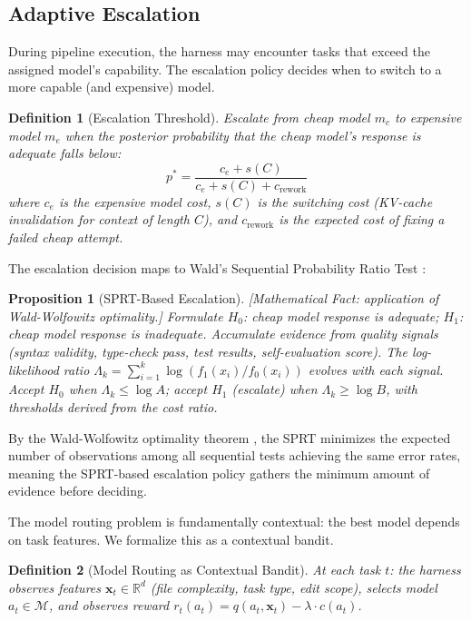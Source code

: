\documentclass[11pt, a4paper]{googledeepmind}
\newtheorem{definition}{Definition}[section]
\newtheorem{proposition}{Proposition}[section]
\begin{document}
\subsection{Adaptive Escalation}

During pipeline execution, the harness may encounter tasks that exceed the assigned model's capability. The escalation policy decides when to switch to a more capable (and expensive) model.

\begin{definition}[Escalation Threshold]
\label{def:routing-escalation}
Escalate from cheap model $m_c$ to expensive model $m_e$ when the posterior probability that the cheap model's response is adequate falls below:
\begin{equation}
p^* = \frac{c_e + s(C)}{c_e + s(C) + c_{\mathrm{rework}}}
\end{equation}
where $c_e$ is the expensive model cost, $s(C)$ is the switching cost (KV-cache invalidation for context of length $C$), and $c_{\mathrm{rework}}$ is the expected cost of fixing a failed cheap attempt.
\end{definition}

The escalation decision maps to Wald's Sequential Probability Ratio Test \citep{wald1945}:

\begin{proposition}[SPRT-Based Escalation]
\emph{[Mathematical Fact: application of Wald-Wolfowitz optimality.]}
\label{prop:routing-sprt}
Formulate $H_0$: cheap model response is adequate; $H_1$: cheap model response is inadequate. Accumulate evidence from quality signals (syntax validity, type-check pass, test results, self-evaluation score). The log-likelihood ratio $\Lambda_k = \sum_{i=1}^k \log(f_1(x_i)/f_0(x_i))$ evolves with each signal. Accept $H_0$ when $\Lambda_k \leq \log A$; accept $H_1$ (escalate) when $\Lambda_k \geq \log B$, with thresholds derived from the cost ratio.
\end{proposition}

By the Wald-Wolfowitz optimality theorem \citep{waldwolfowitz1948}, the SPRT minimizes the expected number of observations among all sequential tests achieving the same error rates, meaning the SPRT-based escalation policy gathers the minimum amount of evidence before deciding.

The model routing problem is fundamentally contextual: the best model depends on task features. We formalize this as a contextual bandit.

\begin{definition}[Model Routing as Contextual Bandit]
\label{def:routing-bandit}
At each task $t$: the harness observes features $\mathbf{x}_t \in \mathbb{R}^d$ (file complexity, task type, edit scope), selects model $a_t \in \mathcal{M}$, and observes reward $r_t(a_t) = q(a_t, \mathbf{x}_t) - \lambda \cdot c(a_t)$.
\end{definition}
\end{document}
